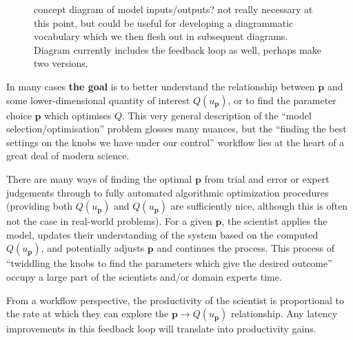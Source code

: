 \documentclass[a4paper,fontsize=12pt]{scrartcl}
\begin{document}
\begin{figure}[h!]
\centering

\caption{concept diagram of model inputs/outputs? not really
  necessary at this point, but could be useful for developing a
  diagrammatic vocabulary which we then flesh out in subsequent
  diagrams. Diagram currently includes the feedback loop as well, 
  perhaps make two versions.}
\end{figure}

In many cases \textbf{the goal} is to better understand the
relationship between $\mathbf{p}$ and some lower-dimensional
quantity of interest $Q(u_{\mathbf{p}})$, or to find the
parameter choice $\mathbf{p}$ which optimises $Q$. %
This very general description of the ``model
selection/optimisation'' problem glosses many nuances, but the
``finding the best settings on the knobs we have under our control''
workflow lies at the heart of a great deal of modern science.

There are many ways of finding the optimal $\mathbf{p}$ from trial and
error or expert judgements through to fully automated algorithmic
optimization procedures (providing both $Q(u_{\mathbf{p}})$ and
$Q(u_{\mathbf{p}})$ are sufficiently nice, although this is often not
the case in real-world problems). For a given $\mathbf{p}$, the
scientist applies the model, updates their understanding of the system
based on the computed $Q(u_{\mathbf{p}})$, and potentially adjusts
$\mathbf{p}$ and continues the process. This process of ``twiddling
the knobs to find the parameters which give the desired outcome''
occupy a large part of the scientists and/or domain experts time.

From a workflow perspective, the productivity of the scientist is
proportional to the rate at which they can explore the
$\mathbf{p} \rightarrow Q(u_{\mathbf{p}})$ relationship. Any latency
improvements in this feedback loop will translate into
productivity gains.

\end{document}
